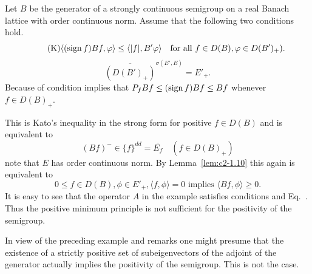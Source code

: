 \begin{remark}\label{rem:c2-3.16}
Let $B$ be the generator of a strongly continuous semigroup on a real Banach lattice with order continuous norm. Assume that the following two conditions hold.
\begin{equation} \label{eq:c2-3.17-K} \tag{K}
\langle(\sign  f)Bf,\phi\rangle \leq \langle|f|,B'\phi\rangle \quad\text{for all } f \in D(B),  \phi \in D(B')_{+}) .
\end{equation}
\begin{equation}
\overline{(D(B')_{+})}^{\sigma(E',E)} = E'_{+}. \label{eq:c2-3.17}
\end{equation}
Because of  condition  implies that $P_{f}Bf \leq (\sign  f)Bf \leq Bf$
whenever $f \in D(B)_{+}$.

This is Kato's inequality in the strong form for positive $f \in D(B)$ and is equivalent to 
\[
(Bf)^{-} \in \{f\}^{dd} = \overline{E_f} \quad (f \in D(B)_{+})
\]
note that $E$ has order continuous norm. By Lemma~\ref{lem:c2-1.10}  this again is equivalent to
\begin{equation}\label{eq:c2-P2} \tag{P}
0 \leq f \in D(B),  \phi \in E'_{+},  \langle f,\phi \rangle = 0 \text{ implies } \langle Bf,\phi \rangle \geq 0.
\end{equation}
It is easy to see that the operator $A$ in the example satisfies conditions   and Eq.~. Thus the positive minimum principle  is not sufficient for the positivity of the semigroup.
\end{remark}
In view of the preceding example and remarks one might presume that the existence of a strictly positive set of subeigenvectors of the adjoint of the generator actually implies the positivity of the semigroup. 
This is not the case.

